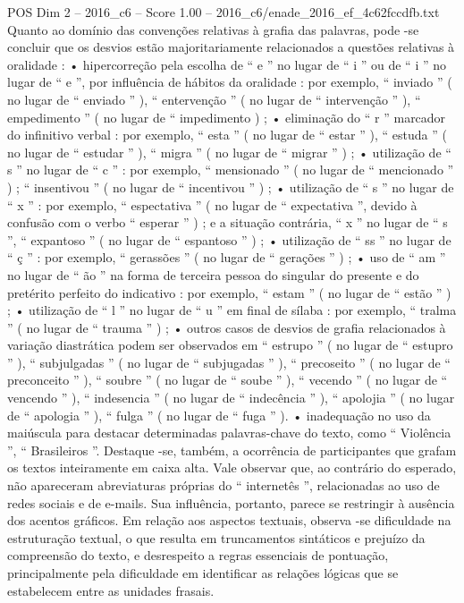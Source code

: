 \begin{textsample}{POS Dim 2 – 2016\_c6 – Score 1.00 – 2016\_c6/enade\_2016\_ef\_4c62fccdfb.txt}
Quanto ao domínio das convenções relativas à grafia das palavras, pode -se concluir que os desvios estão majoritariamente relacionados a questões relativas à oralidade : • hipercorreção pela escolha de “ e ” no lugar de “ i ” ou de “ i ” no lugar de “ e ”, por influência de hábitos da oralidade : por exemplo, “ inviado ” ( no lugar de “ enviado ” ), “ entervenção ” ( no lugar de “ intervenção ” ), “ empedimento ” ( no lugar de “ impedimento ) ; • eliminação do “ r ” marcador do infinitivo verbal : por exemplo, “ esta ” ( no lugar de “ estar ” ), “ estuda ” ( no lugar de “ estudar ” ), “ migra ” ( no lugar de “ migrar ” ) ; • utilização de “ s ” no lugar de “ c ” : por exemplo, “ mensionado ” ( no lugar de “ mencionado ” ) ; “ insentivou ” ( no lugar de “ incentivou ” ) ; • utilização de “ s ” no lugar de “ x ” : por exemplo, “ espectativa ” ( no lugar de “ expectativa ”, devido à confusão com o verbo “ esperar ” ) ; e a situação contrária, “ x ” no lugar de “ s ”, “ expantoso ” ( no lugar de “ espantoso ” ) ; • utilização de “ ss ” no lugar de “ ç ” : por exemplo, “ gerassões ” ( no lugar de “ gerações ” ) ; • uso de “ am ” no lugar de “ ão ” na forma de terceira pessoa do singular do presente e do pretérito perfeito do indicativo : por exemplo, “ estam ” ( no lugar de “ estão ” ) ; • utilização de “ l ” no lugar de “ u ” em final de sílaba : por exemplo, “ tralma ” ( no lugar de “ trauma ” ) ; • outros casos de desvios de grafia relacionados à variação diastrática podem ser observados em “ estrupo ” ( no lugar de “ estupro ” ), “ subjulgadas ” ( no lugar de “ subjugadas ” ), “ precoseito ” ( no lugar de “ preconceito ” ), “ soubre ” ( no lugar de “ soube ” ), “ vecendo ” ( no lugar de “ vencendo ” ), “ indesencia ” ( no lugar de “ indecência ” ), “ apolojia ” ( no lugar de “ apologia ” ), “ fulga ” ( no lugar de “ fuga ” ). • inadequação no uso da maiúscula para destacar determinadas palavras-chave do texto, como “ Violência ”, “ Brasileiros ”.
Destaque -se, também, a ocorrência de participantes que grafam os textos inteiramente em caixa alta.
Vale observar que, ao contrário do esperado, não apareceram abreviaturas próprias do “ internetês ”, relacionadas ao uso de redes sociais e de e-mails.
Sua influência, portanto, parece se restringir à ausência dos acentos gráficos.
Em relação aos aspectos textuais, observa -se dificuldade na estruturação textual, o que resulta em truncamentos sintáticos e prejuízo da compreensão do texto, e desrespeito a regras essenciais de pontuação, principalmente pela dificuldade em identificar as relações lógicas que se estabelecem entre as unidades frasais.

\end{textsample}
